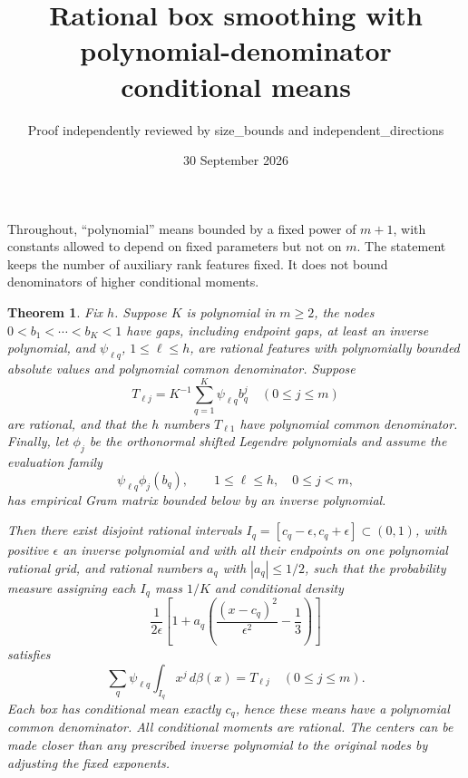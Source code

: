 \documentclass[11pt]{article}
\title{Rational box smoothing with polynomial-denominator conditional means}
\author{Proof independently reviewed by size\_bounds and independent\_directions}
\date{30 September 2026}
\newtheorem{theorem}{Theorem}
\begin{document}
\maketitle
Throughout, ``polynomial'' means bounded by a fixed power of $m+1$,
with constants allowed to depend on fixed parameters but not on $m$.
The statement keeps the number of auxiliary rank features fixed.
It does not bound denominators of higher conditional moments.

\begin{theorem}\label{main}
Fix $h$. Suppose $K$ is polynomial in $m\ge2$, the nodes
$0<b_1<\cdots<b_K<1$ have gaps, including endpoint gaps, at least
an inverse polynomial, and $\psi_{\ell q}$, $1\le\ell\le h$, are
rational features with polynomially bounded absolute values and
polynomial common denominator. Suppose
\[
 T_{\ell j}=K^{-1}\sum_{q=1}^K\psi_{\ell q}b_q^j
 \quad(0\le j\le m)
\]
are rational, and that the $h$ numbers $T_{\ell1}$ have polynomial
common denominator. Finally, let $\phi_j$ be the orthonormal shifted
Legendre polynomials and assume the evaluation family
\[
 \psi_{\ell q}\phi_j(b_q),\qquad 1\le\ell\le h,\quad 0\le j<m,
\]
has empirical Gram matrix bounded below by an inverse polynomial.

Then there exist disjoint rational intervals
$I_q=[c_q-\epsilon,c_q+\epsilon]\subset(0,1)$, with positive
$\epsilon$ an inverse polynomial and with all their endpoints on
one polynomial rational grid, and rational numbers $a_q$ with
$|a_q|\le1/2$, such that the probability measure assigning each
$I_q$ mass $1/K$ and conditional density
\begin{equation}\label{density}
 \frac1{2\epsilon}\left[1+a_q\left(
       \frac{(x-c_q)^2}{\epsilon^2}-\frac13\right)\right]
\end{equation}
satisfies
\[
 \sum_q\psi_{\ell q}\int_{I_q}x^j\,d\beta(x)=T_{\ell j}
 \quad(0\le j\le m).
\]
Each box has conditional mean exactly $c_q$, hence these means
have a polynomial common denominator. All conditional moments are
rational. The centers can be made closer than any prescribed inverse
polynomial to the original nodes by adjusting the fixed exponents.
\end{theorem}
\end{document}
